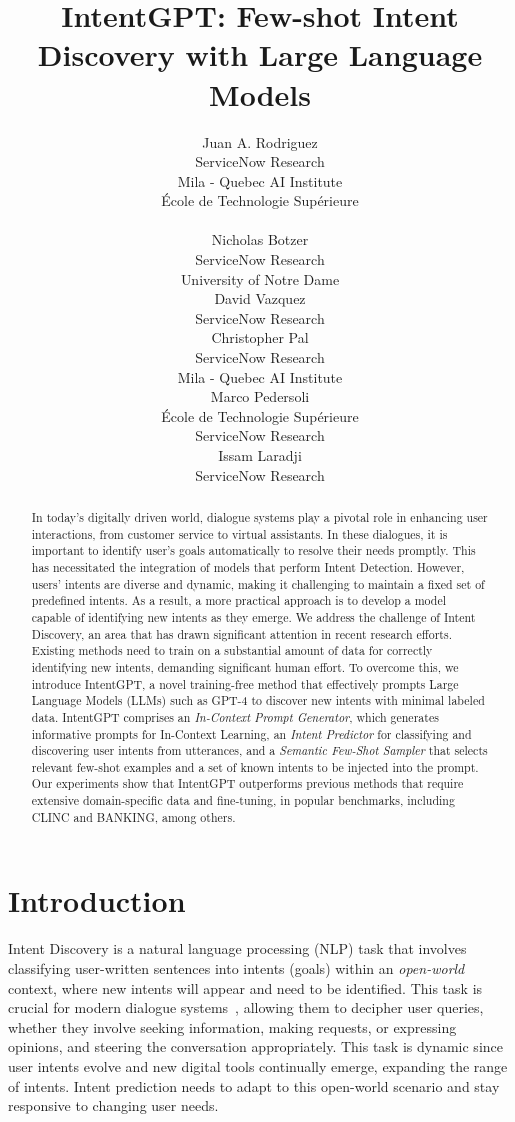 \documentclass[11pt]{article}
\title{IntentGPT: Few-shot Intent Discovery with Large Language Models}
\author{Juan A. Rodriguez \\
  ServiceNow Research\\
  Mila - Quebec AI Institute \\
  École de Technologie Supérieure \\
   \\\And
  Nicholas Botzer \\
  ServiceNow Research \\
  University of Notre Dame \\\And
  David Vazquez \\
  ServiceNow Research \\\AND
  Christopher Pal \\
  ServiceNow Research\\
  Mila - Quebec AI Institute \\\And
  Marco Pedersoli \\
  École de Technologie Supérieure \\
  ServiceNow Research\\\And
  Issam Laradji \\
  ServiceNow Research %
}
\begin{document}
\maketitle

\begin{abstract}
In today's digitally driven world, dialogue systems play a pivotal role in enhancing user interactions, from customer service to virtual assistants. In these dialogues, it is important to identify user's goals automatically to resolve their needs promptly. This has necessitated the integration of models that perform Intent Detection. However, users' intents are diverse and dynamic, making it challenging to maintain a fixed set of predefined intents. As a result, a more practical approach is to develop a model capable of identifying new intents as they emerge. We address the challenge of Intent Discovery, an area that has drawn significant attention in recent research efforts. Existing methods need to train on a substantial amount of data for correctly identifying new intents, demanding significant human effort. To overcome this, we introduce IntentGPT, a novel training-free method that effectively prompts Large Language Models (LLMs) such as GPT-4 to discover new intents with minimal labeled data. IntentGPT comprises an \textit{In-Context Prompt Generator}, which generates informative prompts for In-Context Learning, an \textit{Intent Predictor} for classifying and discovering user intents from utterances, and a \textit{Semantic Few-Shot Sampler} that selects relevant few-shot examples and a set of known intents to be injected into the prompt. Our experiments show that IntentGPT outperforms previous methods that require extensive domain-specific data and fine-tuning, in popular benchmarks, including CLINC and BANKING, among others. 
\end{abstract}

\section{Introduction}\label{introduction}
Intent Discovery is a natural language processing (NLP) task that involves classifying user-written sentences into intents (goals) within an \textit{open-world} context, where new intents will appear and need to be identified. This task is crucial for modern dialogue systems~\citep{degand2020introduction}, allowing them to decipher user queries, whether they involve seeking information, making requests, or expressing opinions, and steering the conversation appropriately. This task is dynamic since user intents evolve and new digital tools continually emerge, expanding the range of intents. Intent prediction needs to adapt to this open-world scenario and stay responsive to changing user needs.
\end{document}
